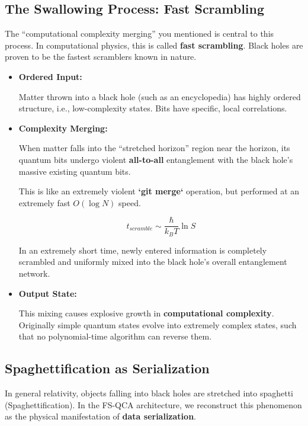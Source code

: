 \subsection{The Swallowing Process: Fast Scrambling}

The ``computational complexity merging'' you mentioned is central to this process. In computational physics, this is called \textbf{fast scrambling}. Black holes are proven to be the fastest scramblers known in nature.

\begin{itemize}
\item \textbf{Ordered Input:}

    Matter thrown into a black hole (such as an encyclopedia) has highly ordered structure, i.e., low-complexity states. Bits have specific, local correlations.

\item \textbf{Complexity Merging:}

    When matter falls into the ``stretched horizon'' region near the horizon, its quantum bits undergo violent \textbf{all-to-all} entanglement with the black hole's massive existing quantum bits.

    This is like an extremely violent \textbf{`git merge`} operation, but performed at an extremely fast \textbf{$O(\log N)$} speed.

    $$t_{scramble} \sim \frac{\hbar}{k_B T} \ln S$$

    In an extremely short time, newly entered information is completely scrambled and uniformly mixed into the black hole's overall entanglement network.

\item \textbf{Output State:}

    This mixing causes explosive growth in \textbf{computational complexity}. Originally simple quantum states evolve into extremely complex states, such that no polynomial-time algorithm can reverse them.
\end{itemize}

\subsection{Spaghettification as Serialization}

In general relativity, objects falling into black holes are stretched into spaghetti (Spaghettification). In the FS-QCA architecture, we reconstruct this phenomenon as the physical manifestation of \textbf{data serialization}.

